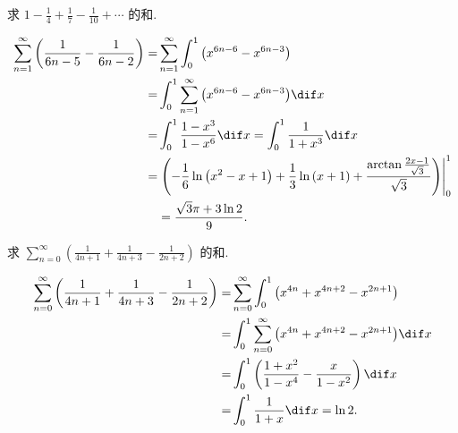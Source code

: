 \documentclass[color=green,titlestyle=hang]{elegantbook}%
\begin{document}
\begin{exercise}
求 $1 - \frac{1}{4} + \frac{1}{7} - \frac{1}{{10}} + \cdots$ 的和.
\end{exercise}\begin{solution}
\begin{align*}\sum\limits_{n = 1}^\infty {\left( {\frac{1}{{6n - 5}} - \frac{1}{{6n - 2}}} \right)} = &\sum\limits_{n = 1}^\infty {\int_0^1 {\left( {{x^{6n - 6}} - {x^{6n - 3}}} \right)} } \\= &\int_0^1 {\sum\limits_{n = 1}^\infty {\left( {{x^{6n - 6}} - {x^{6n - 3}}} \right)} \dif x} \\= &\int_0^1 {\frac{{1 - {x^3}}}{{1 - {x^6}}}\dif x} = \int_0^1 {\frac{1}{{1 + {x^3}}}\dif x} \\=& \left. {\left( { - \frac{1}{6}\ln \left( {{x^2} - x + 1} \right) + \frac{1}{3}\ln \left( {x + 1} \right) + \frac{{\arctan \frac{{2x - 1}}{{\sqrt 3 }}}}{{\sqrt 3 }}} \right)} \right|_0^1 \\
&= \frac{{\sqrt 3 \pi + 3\ln 2}}{9}.
\end{align*}
\end{solution}

\begin{exercise}
求 $\sum\limits_{n = 0}^\infty {\left( {\frac{1}{{4n + 1}} + \frac{1}{{4n + 3}} - \frac{1}{{2n + 2}}} \right)}$ 的和.
\end{exercise}\begin{solution}
\begin{align*}\sum\limits_{n = 0}^\infty {\left( {\frac{1}{{4n + 1}} + \frac{1}{{4n + 3}} - \frac{1}{{2n + 2}}} \right)} =& \sum\limits_{n = 0}^\infty {\int_0^1 {\left( {{x^{4n}} + {x^{4n + 2}} - {x^{2n + 1}}} \right)} } \\= &\int_0^1 {\sum\limits_{n = 0}^\infty {\left( {{x^{4n}} + {x^{4n + 2}} - {x^{2n + 1}}} \right)} \dif x} \\
=& \int_0^1 {\left( {\frac{{1 + {x^2}}}{{1 - {x^4}}} - \frac{x}{{1 - {x^2}}}} \right)\dif x} \\=& \int_0^1 {\frac{1}{{1 + x}}\dif x} = \ln 2.\end{align*}
\end{solution}
\end{document}

